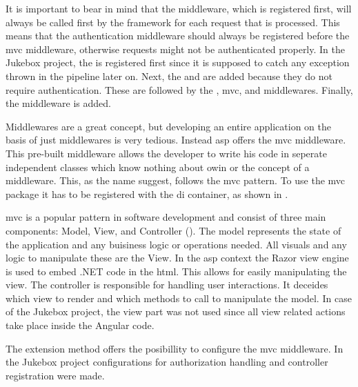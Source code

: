 It is important to bear in mind that the middleware, which is registered first, will always be called first by the framework for each request that is processed. This means that the authentication middleware should always be registered before the \gls{mvc} middleware, otherwise requests might not be authenticated properly. In the Jukebox project, the  is registered first since it is supposed to catch any exception thrown in the pipeline later on. Next, the  and  are added because they do not require authentication. These are followed by the , \gls{mvc}, and  middlewares. Finally, the  middleware is added.




Middlewares are a great concept, but developing an entire application on the basis of just middlewares is very tedious. Instead \gls{asp} offers the \gls{mvc} middleware. This pre-built middleware allows the developer to write his code in seperate independent classes which know nothing about \gls{owin} or the concept of a middleware. This, as the name suggest, follows the \gls{mvc} pattern. To use the \gls{mvc} package it has to be registered with the \gls{di} container, as shown in .

\gls{mvc} is a popular pattern in software development and consist of three main components: Model, View, and Controller (). The model represents the state of the application and any buisiness logic or operations needed. All visuals and any logic to manipulate these are the View. In the \gls{asp} context the Razor view engine is used to embed .NET code in the \gls{html}. This allows for easily manipulating the view. The controller is responsible for handling user interactions. It deceides which view to render and which methods to call to manipulate the model. In case of the Jukebox project, the view part was not used since all view related actions take place inside the Angular code. \cite{mvcOverview}



The  extension method offers the posibillity to configure the \gls{mvc} middleware. In the Jukebox project configurations for authorization handling and controller registration were made.

